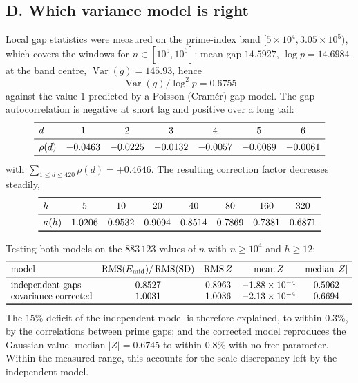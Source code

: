 \documentclass[11pt]{amsart}
\numberwithin{equation}{section}
\theoremstyle{plain}
\theoremstyle{definition}
\theoremstyle{remark}
\begin{document}
\subsection{D. Which variance model is right}
\label{sec:num-variance}
Local gap statistics were measured on the prime-index band
$[5\times10^{4},3.05\times10^{5})$, which covers the windows for
$n\in[10^{5},10^{6}]$: mean gap $14.5927$, $\log p=14.6984$ at the band centre,
$\operatorname{Var}(g)=145.93$, hence
\begin{equation}
\label{eq:gap-variance-ratio}
\operatorname{Var}(g)/\log^{2}p=0.6755
\end{equation}
against the value $1$ predicted by a Poisson (Cram\'er) gap model. The gap
autocorrelation is negative at short lag and positive over a long tail:
\begin{equation}
\label{eq:gap-autocorr-table}
\begin{array}{lcccccc}
\toprule
d & 1 & 2 & 3 & 4 & 5 & 6\\
\midrule
\rho(d) & -0.0463 & -0.0225 & -0.0132 & -0.0057 & -0.0069 & -0.0061\\
\bottomrule
\end{array}
\end{equation}
with $\sum_{1\le d\le420}\rho(d)=+0.4646$. The resulting correction factor
decreases steadily,
\begin{equation}
\label{eq:kappa-table}
\begin{array}{lccccccc}
\toprule
h & 5 & 10 & 20 & 40 & 80 & 160 & 320\\
\midrule
\kappa(h) & 1.0206 & 0.9532 & 0.9094 & 0.8514 & 0.7869 & 0.7381 & 0.6871\\
\bottomrule
\end{array}
\end{equation}

Testing both models on the $883\,123$ values of $n$ with $n\ge10^{4}$ and
$h\ge12$:
\begin{equation}
\label{eq:model-comparison-table}
\begin{array}{lcccc}
\toprule
\text{model} & \operatorname{RMS}(E_{\mathrm{mid}})/\operatorname{RMS}(\mathrm{SD}) & \operatorname{RMS}Z & \operatorname{mean}Z & \operatorname{median}|Z| \\
\midrule
\text{independent gaps} & 0.8527 & 0.8963 & -1.88\times10^{-4} & 0.5962\\
\text{covariance-corrected} & 1.0031 & 1.0036 & -2.13\times10^{-4} & 0.6694\\
\bottomrule
\end{array}
\end{equation}
The $15\%$ deficit of the independent model is therefore explained, to within
$0.3\%$, by the correlations between prime gaps; and the corrected model
reproduces the Gaussian value $\operatorname{median}|Z|=0.6745$ to within $0.8\%$
with no free parameter. Within the measured range, this accounts for the scale discrepancy left by the independent model.
\end{document}
